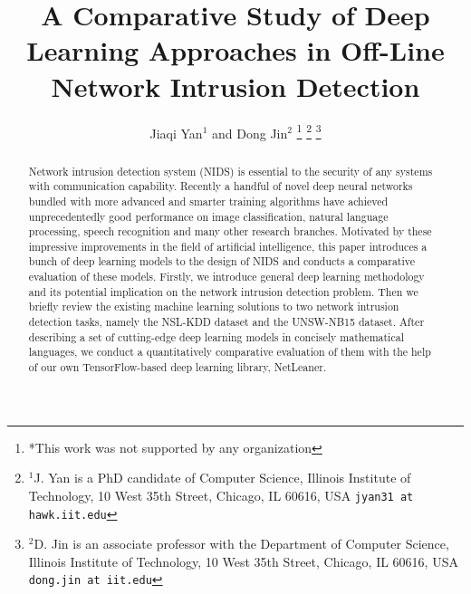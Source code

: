 \documentclass[letterpaper, 10 pt, conference]{ieeeconf}  %
\title{\LARGE \bf
A Comparative Study of Deep Learning Approaches in Off-Line Network Intrusion Detection
}
\author{Jiaqi Yan$^{1}$ and Dong Jin$^{2}$%
\thanks{*This work was not supported by any organization}%
\thanks{$^{1}$J. Yan is a PhD candidate of Computer Science,
        Illinois Institute of Technology, 10 West 35th Street, Chicago, IL 60616, USA
        {\tt\small jyan31 at hawk.iit.edu}}%
\thanks{$^{2}$D. Jin is an associate professor with the Department of Computer Science,
		Illinois Institute of Technology,
        10 West 35th Street, Chicago, IL 60616, USA
        {\tt\small dong.jin at iit.edu}}%
}
\begin{document}
\maketitle
\thispagestyle{empty}
\pagestyle{empty}


\begin{abstract}
Network intrusion detection system (NIDS) is essential to the security of any systems with communication capability.
Recently a handful of novel deep neural networks bundled with more advanced and smarter
training algorithms have achieved unprecedentedly good performance on image classification,
natural language processing, speech recognition and many other research branches.
Motivated by these impressive improvements in the field of artificial intelligence,
this paper introduces a bunch of deep learning models to the design of NIDS
and conducts a comparative evaluation of these models.
Firstly, we introduce general deep learning methodology and its potential implication on the
network intrusion detection problem.
Then we briefly review the existing machine learning solutions to two network intrusion detection tasks, namely the NSL-KDD dataset and the UNSW-NB15 dataset.
After describing a set of cutting-edge deep learning models in concisely mathematical languages,
we conduct a quantitatively comparative evaluation of them with the help of
our own TensorFlow-based deep learning library, NetLeaner.
\end{abstract}












\end{document}

